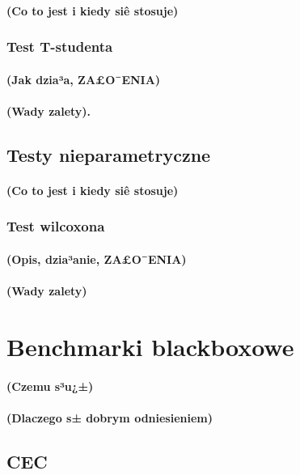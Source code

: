 \documentclass[11pt]{report}
\begin{document}
\paragraph{
(Co to jest i kiedy siê stosuje)
}
\subsubsection{Test T-studenta}
\paragraph{
(Jak dzia³a, ZA£O¯ENIA)
}
\paragraph{
(Wady zalety).
}

\subsection{Testy nieparametryczne}
\paragraph{
(Co to jest i kiedy siê stosuje)
}
\subsubsection{Test wilcoxona}
\paragraph{
(Opis, dzia³anie, ZA£O¯ENIA)
}
\paragraph{
(Wady zalety)
}
\section{Benchmarki blackboxowe}
\paragraph{
(Czemu s³u¿±)
}
\paragraph{
(Dlaczego s± dobrym odniesieniem)
}

\subsection{CEC}
\end{document}

